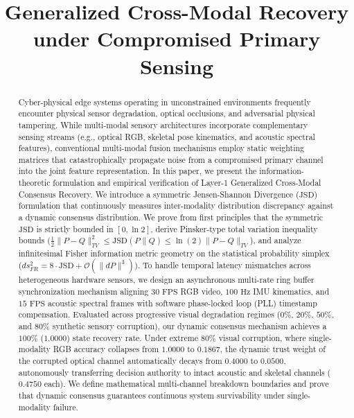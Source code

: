 \documentclass[conference]{IEEEtran}
\begin{document}
\title{Generalized Cross-Modal Recovery under Compromised Primary Sensing}

\author{
}

\maketitle

\begin{abstract}
Cyber-physical edge systems operating in unconstrained environments frequently encounter physical sensor degradation, optical occlusions, and adversarial physical tampering. While multi-modal sensory architectures incorporate complementary sensing streams (e.g., optical RGB, skeletal pose kinematics, and acoustic spectral features), conventional multi-modal fusion mechanisms employ static weighting matrices that catastrophically propagate noise from a compromised primary channel into the joint feature representation. In this paper, we present the information-theoretic formulation and empirical verification of Layer-1 Generalized Cross-Modal Consensus Recovery. We introduce a symmetric Jensen-Shannon Divergence ($\text{JSD}$) formulation that continuously measures inter-modality distribution discrepancy against a dynamic consensus distribution. We prove from first principles that the symmetric $\text{JSD}$ is strictly bounded in $[0, \ln 2]$, derive Pinsker-type total variation inequality bounds ($\frac{1}{2}\|P - Q\|_{TV}^2 \le \text{JSD}(P \parallel Q) \le \ln(2)\|P - Q\|_{TV}$), and analyze infinitesimal Fisher information metric geometry on the statistical probability simplex ($ds_{FR}^2 = 8 \cdot \mathrm{JSD} + \mathcal{O}(\|dP\|^3)$). To handle temporal latency mismatches across heterogeneous hardware sensors, we design an asynchronous multi-rate ring buffer synchronization mechanism aligning $30\text{ FPS}$ RGB video, $100\text{ Hz}$ IMU kinematics, and $15\text{ FPS}$ acoustic spectral frames with software phase-locked loop (PLL) timestamp compensation. Evaluated across progressive visual degradation regimes ($0\%$, $20\%$, $50\%$, and $80\%$ synthetic sensory corruption), our dynamic consensus mechanism achieves a $100\%$ ($1.0000$) state recovery rate. Under extreme $80\%$ visual corruption, where single-modality RGB accuracy collapses from $1.0000$ to $0.1867$, the dynamic trust weight of the corrupted optical channel automatically decays from $0.4000$ to $0.0500$, autonomously transferring decision authority to intact acoustic and skeletal channels ($0.4750$ each). We define mathematical multi-channel breakdown boundaries and prove that dynamic consensus guarantees continuous system survivability under single-modality failure.
\end{abstract}
\end{document}
